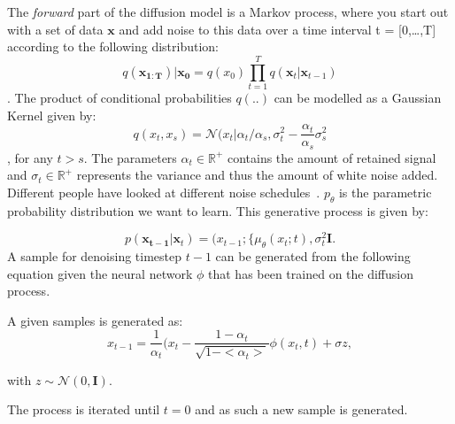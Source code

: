\documentclass[journal=jacsat,manuscript=article]{achemso}
\begin{document}
The \textit{forward} part of the diffusion model is a Markov process, where you start out with a set of data $\mathbf{x}$ and add noise to this data over a time interval t = [0,\ldots,T] according to the following distribution:
\begin{equation}
  q(\mathbf{x_{1:T}})|\mathbf{x_0} = q(x_0)\prod_{t=1}^T q(\mathbf{x}_t|\mathbf{x}_{t-1})
\end{equation}.
The product of conditional probabilities $q(..)$ can be modelled as a Gaussian Kernel given by:
\begin{equation}
    q(x_t, x_s)=\mathcal{N}(x_t|\alpha_t/\alpha_s, \sigma_t^2-\frac{\alpha_t}{\alpha_s}\sigma^2_s
\end{equation},
for any $t>s$. The parameters $\alpha_t \in \mathbb{R}^{+}$ contains the amount of retained signal and $\sigma_t \in \mathbb{R}^+$ represents the variance and thus the amount of white noise added. 
Different people have looked at different noise schedules~\cite{sohl-dickstein2015deep, ho2020denoising}.
$p_{\theta}$ is the parametric probability distribution we want to learn. This generative process is given by:

\begin{equation}
p(\mathbf{x_{t-1}}|\mathbf{x}_t)=\mathcal(x_{t-1}; \{\mu_{\theta}(x_t;t), \sigma_t^2\mathbf{I}.
\end{equation}
A sample for denoising timestep $t-1$ can be generated from the following equation given the neural network $\phi$ that has been trained on the diffusion process. 

A given samples is generated as:
\begin{equation}
 x_{t-1} = \frac{1}{\alpha_t}(x_t-\frac{1-\alpha_t}{\sqrt{1-<\alpha_t>}}\phi(x_t,t) +\sigma z,   
\end{equation}

with $z\sim\mathcal{N}(0,\mathbf{I})$.

The process is iterated until $t=0$ and as such a new sample is generated. 

\end{document}

